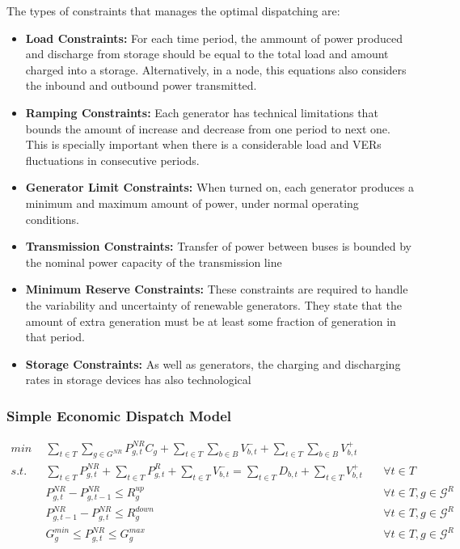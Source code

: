 \documentclass[12pt,LUDisStyle,twosided]{book}
\newcommand{\mc}{\mathcal}
\begin{document}
The types of constraints that manages the optimal dispatching are:

\begin{itemize}
\item \textbf{Load Constraints:} For each time period, the ammount of power produced and discharge from storage should be equal to the total load and amount charged into a storage. Alternatively, in a node, this equations also considers the inbound and outbound power transmitted.
\item \textbf{Ramping Constraints:}  Each generator has technical limitations that bounds the amount of increase and decrease from one period to next one. This is specially important when there is a considerable load and VERs fluctuations in consecutive periods.
\item \textbf{Generator Limit Constraints:} When turned on, each generator produces a minimum and maximum amount of power, under normal operating conditions.
\item \textbf{Transmission Constraints:} Transfer of power between buses is bounded by the nominal power capacity of the transmission line
\item \textbf{Minimum Reserve Constraints:} These constraints are required to handle the variability and uncertainty of renewable generators. They state that the amount of extra generation must be at least some fraction of generation in that period.
\item \textbf{Storage Constraints:} As well as generators, the charging and discharging rates in storage devices has also technological 


\end{itemize}

\subsubsection{Simple Economic Dispatch Model}

\begin{subequations}\label{model:simple_ED}
\begin{alignat}{4}
min ~~& \sum_{t \in T}\sum_{g \in G^{NR}} P^{NR}_{g,t} C_{g} + \sum_{t \in T}\sum_{b \in B} V^{-}_{b,t} + \sum_{t \in T}\sum_{b \in B} V^{+}_{b,t} \label{eq:ObjectiveFunction} \\
s.t. ~~~& \sum_{t \in T} P^{NR}_{g,t} + \sum_{t \in T} P^{R}_{g,t} + \sum_{t \in T}V^{-}_{b,t} = \sum_{t \in T} D_{b,t}  + \sum_{t \in T}V^{+}_{b,t}  &~& \forall t \in T  \label{eq:loadBalanceConstraint} \\
& P^{NR}_{g,t} - P^{NR}_{g,t - 1} \leq R^{up}_{g} &~& \forall t \in T, g \in \mc{G}^{R}\label{eq:rampUpRateConstraint} \\
& P^{NR}_{g,t -1 } - P^{NR}_{g,t} \leq R^{down}_{g} &~& \forall t \in T, g \in \mc{G}^{R}\label{eq:rampDownRateConstraint} \\
& G^{min}_{g}\leq P^{NR}_{g,t} \leq G^{max}_{g} &~& \forall t \in T, g \in \mc{G}^{R}\label{eq:generationBounds}
\end{alignat} 
\end{subequations}
\end{document}
